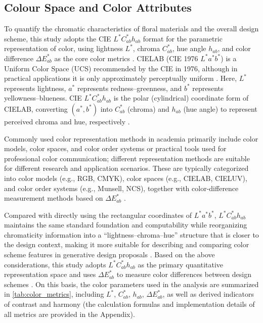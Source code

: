 \subsection{Colour Space and Color Attributes}

To quantify the chromatic characteristics of floral materials and the overall design scheme, this study adopts the CIE $L^{*}C_{ab}^{*}h_{ab}$ format for the parametric representation of color, using lightness $L^{*}$, chroma $C_{ab}^{*}$, hue angle $h_{ab}$, and color difference $\Delta E_{ab}^{*}$ as the core color metrics \citep{CIE2004Colorimetry,ISOCIE2008Lab,CIE2012ILV}. CIELAB (CIE 1976 $L^{*}a^{*}b^{*}$) is a Uniform Color Space (UCS) recommended by the CIE in 1976, although in practical applications it is only approximately perceptually uniform \citep{Luo2016CIELAB}. Here, $L^{*}$ represents lightness, $a^{*}$ represents redness--greenness, and $b^{*}$ represents yellowness--blueness. CIE $L^{*}C_{ab}^{*}h_{ab}$ is the polar (cylindrical) coordinate form of CIELAB, converting $(a^{*}, b^{*})$ into $C_{ab}^{*}$ (chroma) and $h_{ab}$ (hue angle) to represent perceived chroma and hue, respectively \citep{CIE2004Colorimetry,ISOCIE2008Lab}.

Commonly used color representation methods in academia primarily include color models, color spaces, and color order systems or practical tools used for professional color communication; different representation methods are suitable for different research and application scenarios. These are typically categorized into color models (e.g., RGB, CMYK), color spaces (e.g., CIELAB, CIELUV), and color order systems (e.g., Munsell, NCS), together with color-difference measurement methods based on $\Delta E_{ab}^{*}$ \citep{NemcsicsCaivano2016COS,Munsell1942BookOfColor,HardSivik2001NCS}.

Compared with directly using the rectangular coordinates of $L^{*}a^{*}b^{*}$, $L^{*}C_{ab}^{*}h_{ab}$ maintains the same standard foundation and computability while reorganizing chromaticity information into a ``lightness--chroma--hue'' structure that is closer to the design context, making it more suitable for describing and comparing color scheme features in generative design proposals \citep{Luo2016CIELAB}. Based on the above considerations, this study adopts $L^{*}C_{ab}^{*}h_{ab}$ as the primary quantitative representation space and uses $\Delta E_{ab}^{*}$ to measure color differences between design schemes \citep{ClarkeMcDonaldRigg1984JPC79,CIE1995IndustrialDiff,Melgosa2016CIE94,LuoCuiRigg2001CIEDE2000,Luo2016CIEDE2000}. On this basis, the color parameters used in the analysis are summarized in \autoref{tab:color_metrics}, including $L^{*}$, $C_{ab}^{*}$, $h_{ab}$, $\Delta E_{ab}^{*}$, as well as derived indicators of contrast and harmony (the calculation formulas and implementation details of all metrics are provided in the Appendix).

